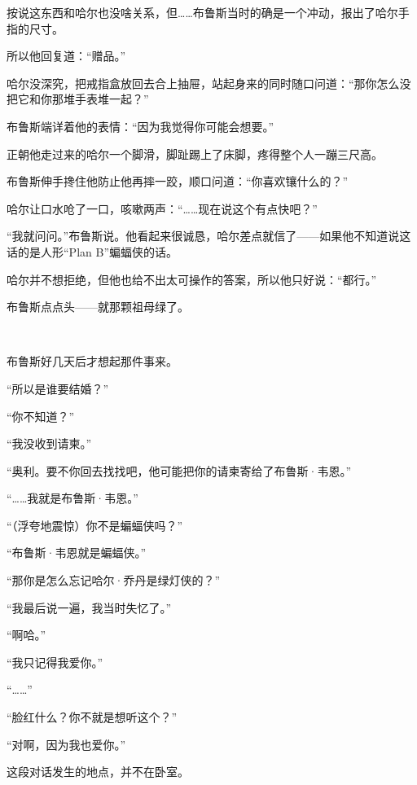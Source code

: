 \documentclass[../main.tex]{subfiles}
\begin{document}
按说这东西和哈尔也没啥关系，但……布鲁斯当时的确是一个冲动，报出了哈尔手指的尺寸。

所以他回复道：“赠品。”

哈尔没深究，把戒指盒放回去合上抽屉，站起身来的同时随口问道：“那你怎么没把它和你那堆手表堆一起？”

布鲁斯端详着他的表情：“因为我觉得你可能会想要。”

正朝他走过来的哈尔一个脚滑，脚趾踢上了床脚，疼得整个人一蹦三尺高。

布鲁斯伸手搀住他防止他再摔一跤，顺口问道：“你喜欢镶什么的？”

哈尔让口水呛了一口，咳嗽两声：“……现在说这个有点快吧？”

“我就问问。”布鲁斯说。他看起来很诚恳，哈尔差点就信了——如果他不知道说这话的是人形“Plan
B”蝙蝠侠的话。

哈尔并不想拒绝，但他也给不出太可操作的答案，所以他只好说：“都行。”

布鲁斯点点头——就那颗祖母绿了。

~\

布鲁斯好几天后才想起那件事来。

“所以是谁要结婚？”

“你不知道？”

“我没收到请柬。”

“奥利。要不你回去找找吧，他可能把你的请柬寄给了布鲁斯·韦恩。”

“……我就是布鲁斯·韦恩。”

“（浮夸地震惊）你不是蝙蝠侠吗？”

“布鲁斯·韦恩就是蝙蝠侠。”

“那你是怎么忘记哈尔·乔丹是绿灯侠的？”

“我最后说一遍，我当时失忆了。”

“啊哈。”

“我只记得我爱你。”

“……”

“脸红什么？你不就是想听这个？”

“对啊，因为我也爱你。”

这段对话发生的地点，并不在卧室。

\storyend
\end{document}
